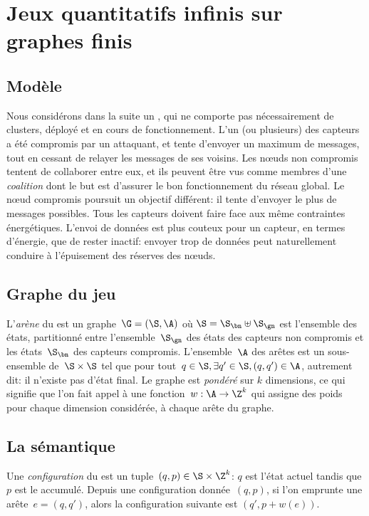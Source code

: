 \section{Jeux quantitatifs infinis sur graphes finis}
\label{tj:sec:model}

\subsection{Modèle}
Nous considérons dans la suite un \rcsf, qui ne comporte pas nécessairement de clusters, déployé et en cours de fonctionnement.
L'un (ou plusieurs) des capteurs a été compromis par un attaquant, et tente d'envoyer un maximum de messages, tout en cessant de relayer les messages de ses voisins.
Les nœuds non compromis tentent de collaborer entre eux, et ils peuvent être vus comme membres d'une \emph{coalition} dont le but est d'assurer le bon fonctionnement du réseau global.
Le nœud compromis poursuit un objectif différent: il tente d'envoyer le plus de messages possibles.
Tous les capteurs doivent faire face aux même contraintes énergétiques.
L'envoi de données est plus couteux pour un capteur, en termes d'énergie, que de rester inactif: envoyer trop de données peut naturellement conduire à l'épuisement des réserves des nœuds.

\subsection{Graphe du jeu}
L'\emph{arène} du  est un graphe~$\G = (\S,\A)$ où $\S = \S_\bn \uplus \S_\gn$ est l'ensemble des états, partitionné entre l'ensemble~$\S_\gn$ des états des capteurs non compromis et les états~$\S_\bn$ des capteurs compromis.
L'ensemble~$\A$ des arêtes est un sous-ensemble de~$\S \times \S$ tel que pour tout~$q \in \S, \exists q' \in \S, (q,q')\in \A$, autrement dit: il n'existe pas d'état final.
Le graphe est \emph{pondéré} sur $k$ dimensions, ce qui signifie que l'on fait appel à une fonction~$w: \A \rightarrow \Z^k$ qui assigne des poids pour chaque dimension considérée, à chaque arête du graphe.

\subsection{La sémantique}
Une \emph{configuration} du  est un tuple~$(q,p) \in \S \times \Z^k$: $q$ est l'état actuel tandis que $p$ est le  accumulé.
Depuis une configuration donnée~$(q,p)$, si l'on emprunte une arête~$e=(q,q')$, alors la configuration suivante est $(q',p+w(e))$.

